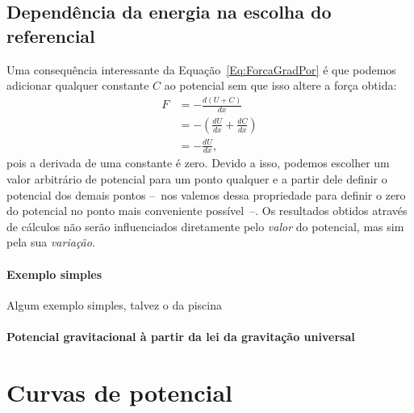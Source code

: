 \subsection{Dependência da energia na escolha do referencial}

Uma consequência interessante da Equação~\eqref{Eq:ForcaGradPor} é que podemos adicionar qualquer constante $C$ ao potencial sem que isso altere a força obtida:
\begin{align}
  F &= - \frac{d(U+C)}{dx} \\
  &= -\left(\frac{dU}{dx} + \frac{dC}{dx}\right) \\
  &= -\frac{dU}{dx},
\end{align}
%
pois a derivada de uma constante é zero. Devido a isso, podemos escolher um valor arbitrário de potencial para um ponto qualquer e a partir dele definir o potencial dos demais pontos --~nos valemos dessa propriedade para definir o zero do potencial no ponto mais conveniente possível~--. Os resultados obtidos através de cálculos não serão influenciados diretamente pelo \emph{valor} do potencial, mas sim pela sua \emph{variação}. 


\paragraph{Exemplo simples}
Algum exemplo simples, talvez o da piscina

\paragraph{Potencial gravitacional à partir da lei da gravitação universal}

\section{Curvas de potencial}

